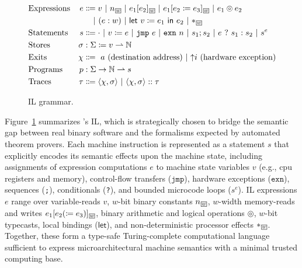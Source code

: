 \begin{figure}[t]
\small
\begin{align*}
  &\text{Expressions} & e &\Coloneqq v~|~n\ofwidth{w}~|~e_1[e_2]\ofwidth{w}~|~e_1[e_2\coloneqq e_3]\ofwidth{w}~|~e_1\circledcirc e_2 \\
  & & & \hphantom{\Coloneqq}|~(e:w)~|~\mathsf{let}~v\coloneqq e_1~\mathsf{in}~e_2~|~{*}\ofwidth{w} \\
  &\text{Statements} & s &\Coloneqq \cdot~|~v\coloneqq e~|~\mathtt{jmp}~e~|~\mathtt{exn}~n~|~s_1;s_2~|~e~?~s_1:s_2~|~s^e \\
  &\text{Stores} & \sigma &: \Sigma\coloneqq v\rightharpoonup\mathbb{N} \\
  &\text{Exits} & \chi &\Coloneqq~a~\text{(destination address)}~|~{\uparrow}i~\text{(hardware exception)} \\
  &\text{Programs} & p &: \Sigma\rightarrow\mathbb{N}\rightharpoonup s \\
  &\text{Traces} & \tau &\Coloneqq \langle\chi,\sigma\rangle~|~\langle\chi,\sigma\rangle::\tau
  \end{align*}
\vspace{-15pt}
\caption{\Picinae{} IL grammar.}\label{fig:picinae_il}
\end{figure}

Figure~\ref{fig:picinae_il} summarizes \Picinae{}'s IL, which is strategically chosen to bridge the semantic gap between real binary software and the formalisms expected by automated theorem provers.
Each machine instruction is represented as a statement $s$ that explicitly encodes its semantic effects upon the machine state, including assignments of expression computations $e$ to machine state variables $v$ (e.g., cpu registers and memory), control-flow transfers ($\mathtt{jmp}$), hardware exceptions ($\mathtt{exn}$), sequences (\texttt{;}), conditionals (\texttt{?}), and bounded microcode loops ($s^e$).
IL expressions $e$ range over variable-reads $v$, $w$-bit binary constants $n\ofwidth{w}$, $w$-width memory-reads and writes $e_1[e_2 (\coloneqq e_3)]\ofwidth{w}$, binary arithmetic and logical operations $\circledcirc$, $w$-bit typecasts, local bindings ($\mathsf{let}$), and non-deterministic processor effects $*\ofwidth{w}$.
Together, these form a type-safe Turing-complete computational language sufficient to express microarchitectural machine semantics with a minimal trusted computing base.

